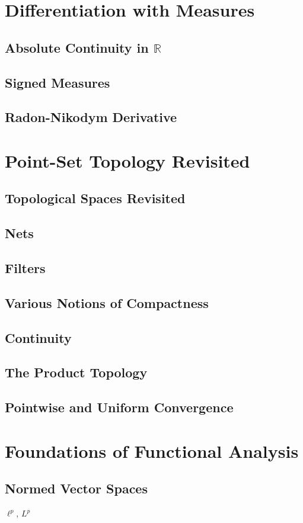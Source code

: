 \documentclass{article}
\newcommand{\R}{\mathbb{R}}
\theoremstyle{definition}
\begin{document}
	\section{Differentiation with Measures}
	\subsection{Absolute Continuity in $ \R $}
	\subsection{Signed Measures}
	\subsection{Radon-Nikodym Derivative}
	\section{Point-Set Topology Revisited}
	\subsection{Topological Spaces Revisited}
	\subsection{Nets}
	\subsection{Filters}
	\subsection{Various Notions of Compactness}
	\subsection{Continuity}
	\subsection{The Product Topology}
	\subsection{Pointwise and Uniform Convergence}
	\section{Foundations of Functional Analysis}
	\subsection{Normed Vector Spaces}
	$ \ell^p $, $ L^p $
\end{document}
